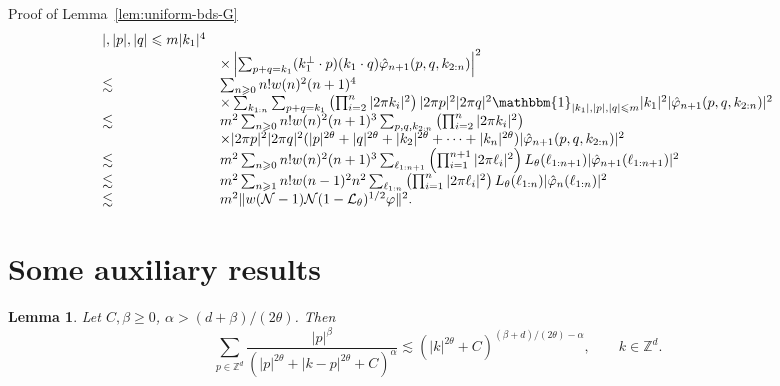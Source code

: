 \documentclass{article}
\newenvironment{proof*}[1]{\noindent\textbf{#1\ }}{\hspace*{\fill}$\Box$\medskip}
\newtheorem{lemma}{Lemma}
\begin{document}
\begin{proof*}{Proof of Lemma~\ref{lem:uniform-bds-G}}
\[\begin{array}{ll}
{{       |, | p |, | q | \leqslant m}}{| k_1 |^4}\\
       & \times \left| \sum_{p + q = k_1} (k_1^{\perp} \cdot p)  (k_1 \cdot
       q) \hat{\varphi}_{n + 1} (p, q, k_{2 : n}) \right|^2\\
       \lesssim & \sum_{n \geqslant 0} n! w (n)^2 (n + 1)^4\\
       & \times \sum_{k_{1 : n}} \sum_{p + q = k_1} \left( \prod_{i = 2}^n |
       2 \pi k_i |^2 \right) | 2 \pi p |^2 | 2 \pi q |^2 \mathbbm{1}_{| k_1 |,
       | p |, | q | \leqslant m} | k_1 |^2 | \hat{\varphi}_{n + 1} (p, q, k_{2
       : n}) |^2\\
       \lesssim & m^2 \sum_{n \geqslant 0} n! w (n)^2 (n + 1)^3 \sum_{p, q,
       k_{2 : n}} \left( \prod_{i = 2}^n | 2 \pi k_i |^2 \right)\\
       & \times | 2 \pi p |^2 | 2 \pi q |^2 (| p |^{2 \theta} + | q |^{2
       \theta} + | k_2 |^{2 \theta} + \cdots + | k_n |^{2 \theta}) |
       \hat{\varphi}_{n + 1} (p, q, k_{2 : n}) |^2\\
       \lesssim & m^2 \sum_{n \geqslant 0} n! w (n)^2 (n + 1)^3 \sum_{\ell_{1
       : n + 1}} \left( \prod_{i = 1}^{n + 1} | 2 \pi \ell_i |^2 \right)
       L_{\theta} (\ell_{1 : n + 1}) | \hat{\varphi}_{n + 1} (\ell_{1 : n +
       1}) |^2\\
       \lesssim & m^2 \sum_{n \geqslant 1} n! w (n - 1)^2 n^2 \sum_{\ell_{1 :
       n}} \left( \prod_{i = 1}^n | 2 \pi \ell_i |^2 \right) L_{\theta}
       (\ell_{1 : n}) | \hat{\varphi}_n (\ell_{1 : n}) |^2\\
       \lesssim & m^2 \| w (\mathcal{N}- 1) \mathcal{N} (1
       -\mathcal{L}_{\theta})^{1 / 2} \varphi \|^2 .
     \end{array} \]
  
\end{proof*}

\appendix\section{Some auxiliary results}\label{s:app-A}

\begin{lemma}
  \label{lem:app-estimate}Let $C, \beta \geqslant 0$, $\alpha > (d + \beta) /
  (2 \theta)$. Then
  \[ \sum_{p \in \mathbb{Z}^d} \frac{| p |^{\beta}}{(| p |^{2 \theta} + | k -
     p |^{2 \theta} + C)^{\alpha}} \lesssim (| k |^{2 \theta} + C)^{(\beta +
     d) / (2 \theta) - \alpha}, \qquad k \in \mathbb{Z}^d . \]
\end{lemma}
\end{document}
